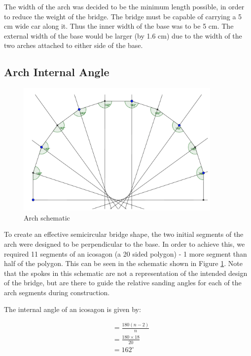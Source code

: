 \documentclass[a4paper,11pt]{article}
\begin{document}
The width of the arch was decided to be the minimum length possible, in order to
reduce the weight of the bridge.
The bridge must be capable of carrying a 5 cm wide car along it.
Thus the inner width of the base was to be 5 cm.
The external width of the base would be larger (by 1.6 cm) due to the width of
the two arches attached to either side of the base.


\subsection{Arch Internal Angle}

\begin{figure}
\begin{center}
\includegraphics[width=10cm]{figures/schematic.png}
\end{center}
\caption{Arch schematic}
\label{construction:schematic}
\end{figure}

To create an effective semicircular bridge shape, the two initial segments of
the arch were designed to be perpendicular to the base.
In order to achieve this, we required 11 segments of an icosagon (a 20 sided
polygon) - 1 more segment than half of the polygon.
This can be seen in the schematic shown in Figure \ref{construction:schematic}.
Note that the spokes in this schematic are not a representation of the intended
design of the bridge, but are there to guide the relative sanding angles for
each of the arch segments during construction.

The internal angle of an icosagon is given by:

$$
\begin{aligned}
& = \frac{180(n - 2)}{n} \\
& = \frac{180 \times 18}{20} \\
& = 162^\circ \\
\end{aligned}
$$
\end{document}
